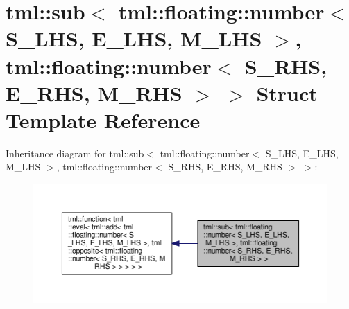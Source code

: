\hypertarget{structtml_1_1sub_3_01tml_1_1floating_1_1number_3_01_s___l_h_s_00_01_e___l_h_s_00_01_m___l_h_s_01cc487f559453bde0ccb51ce04069284f}{\section{tml\+:\+:sub$<$ tml\+:\+:floating\+:\+:number$<$ S\+\_\+\+L\+H\+S, E\+\_\+\+L\+H\+S, M\+\_\+\+L\+H\+S $>$, tml\+:\+:floating\+:\+:number$<$ S\+\_\+\+R\+H\+S, E\+\_\+\+R\+H\+S, M\+\_\+\+R\+H\+S $>$ $>$ Struct Template Reference}
\label{structtml_1_1sub_3_01tml_1_1floating_1_1number_3_01_s___l_h_s_00_01_e___l_h_s_00_01_m___l_h_s_01cc487f559453bde0ccb51ce04069284f}
}


Inheritance diagram for tml\+:\+:sub$<$ tml\+:\+:floating\+:\+:number$<$ S\+\_\+\+L\+H\+S, E\+\_\+\+L\+H\+S, M\+\_\+\+L\+H\+S $>$, tml\+:\+:floating\+:\+:number$<$ S\+\_\+\+R\+H\+S, E\+\_\+\+R\+H\+S, M\+\_\+\+R\+H\+S $>$ $>$\+:
\nopagebreak
\begin{figure}[H]
\begin{center}
\leavevmode
\includegraphics[width=350pt]{structtml_1_1sub_3_01tml_1_1floating_1_1number_3_01_s___l_h_s_00_01_e___l_h_s_00_01_m___l_h_s_012b56032f2692cc637ea98eb06d16dd29}
\end{center}
\end{figure}


